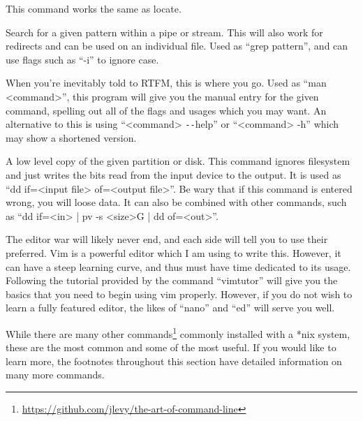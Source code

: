\begin{description}
				This command works the same as locate. 
			\item[grep]
				Search for a given pattern within a pipe or stream. 
				This will also work for redirects and can be used on an individual file. 
				Used as ``grep pattern'', and can use flags such as ``-i'' to ignore case. 
			\item[man\footnote{\url{http://linux.die.net/man/}}]
				When you're inevitably told to RTFM, this is where you go. 
				Used as ``man <command>'', this program will give you the manual entry for the given command, spelling out all of the flags and usages which you may want. 
				An alternative to this is using ``<command> \verb+--+help'' or ``<command> -h'' which may show a shortened version. 
			\item[dd]
				A low level copy of the given partition or disk. 
				This command ignores filesystem and just writes the bits read from the input device to the output. 
				It is used as ``dd if=<input file> of=<output file>''.
				Be wary that if this command is entered wrong, you will loose data. 
				It can also be combined with other commands, such as ``dd if=<in> | pv -s <size>G | dd of=<out>''.
			\item[vim]
				The editor war will likely never end, and each side will tell you to use their preferred. 
				Vim is a powerful editor which I am using to write this. 
				However, it can have a steep learning curve, and thus must have time dedicated to its usage. 
				Following the tutorial provided by the command ``vimtutor'' will give you the basics that you need to begin using vim properly. 
				However, if you do not wish to learn a fully featured editor, the likes of ``nano'' and ``ed'' will serve you well. 
		\end{description}
		While there are many other commands\footnote{\url{https://github.com/jlevy/the-art-of-command-line}} commonly installed with a \**nix system, these are the most common and some of the most useful. If you would like to learn more, the footnotes throughout this section have detailed information on many more commands. 


